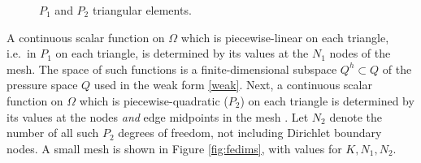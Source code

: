 \documentclass[letterpaper,final,12pt,reqno]{amsart}
\begin{document}
\begin{figure}[ht]
\caption{$P_1$ and $P_2$ triangular elements.}
\label{fig:fedofs}
\end{figure}

A continuous scalar function on $\Omega$ which is piecewise-linear on each triangle, i.e.~in $P_1$ on each triangle, is determined by its values at the $N_1$ nodes of the mesh.  The space of such functions is a finite-dimensional subspace $Q^h \subset Q$ of the pressure space $Q$ used in the weak form \eqref{weak}.  Next, a continuous scalar function on $\Omega$ which is piecewise-quadratic ($P_2$) on each triangle is determined by its values at the nodes \emph{and} edge midpoints in the mesh \cite{Elmanetal2014}.  Let $N_2$ denote the number of all such $P_2$ degrees of freedom, not including Dirichlet boundary nodes.  A small mesh is shown in Figure \ref{fig:fedims}, with values for $K,N_1,N_2$.
\end{document}
